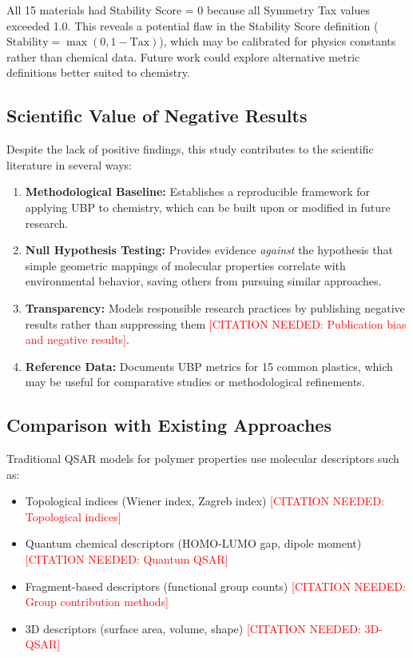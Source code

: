 \documentclass[11pt,letterpaper]{article}
\begin{document}
All 15 materials had Stability Score = 0 because all Symmetry Tax values exceeded 1.0. This reveals a potential flaw in the Stability Score definition ($\text{Stability} = \max(0, 1 - \text{Tax})$), which may be calibrated for physics constants rather than chemical data. Future work could explore alternative metric definitions better suited to chemistry.

\subsection{Scientific Value of Negative Results}

Despite the lack of positive findings, this study contributes to the scientific literature in several ways:

\begin{enumerate}
    \item \textbf{Methodological Baseline:} Establishes a reproducible framework for applying UBP to chemistry, which can be built upon or modified in future research.

    \item \textbf{Null Hypothesis Testing:} Provides evidence \textit{against} the hypothesis that simple geometric mappings of molecular properties correlate with environmental behavior, saving others from pursuing similar approaches.

    \item \textbf{Transparency:} Models responsible research practices by publishing negative results rather than suppressing them \textcolor{red}{[CITATION NEEDED: Publication bias and negative results]}.

    \item \textbf{Reference Data:} Documents UBP metrics for 15 common plastics, which may be useful for comparative studies or methodological refinements.
\end{enumerate}

\subsection{Comparison with Existing Approaches}

Traditional QSAR models for polymer properties use molecular descriptors such as:
\begin{itemize}
    \item Topological indices (Wiener index, Zagreb index) \textcolor{red}{[CITATION NEEDED: Topological indices]}
    \item Quantum chemical descriptors (HOMO-LUMO gap, dipole moment) \textcolor{red}{[CITATION NEEDED: Quantum QSAR]}
    \item Fragment-based descriptors (functional group counts) \textcolor{red}{[CITATION NEEDED: Group contribution methods]}
    \item 3D descriptors (surface area, volume, shape) \textcolor{red}{[CITATION NEEDED: 3D-QSAR]}
\end{itemize}
\end{document}

